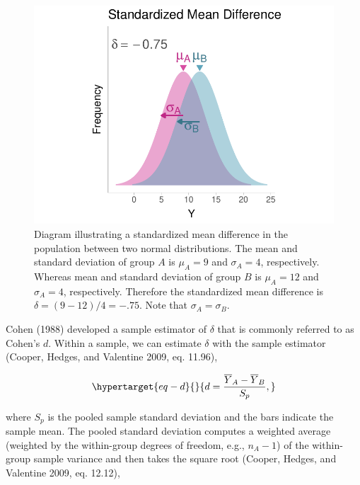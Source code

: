 \documentclass[
  letterpaper,
  DIV=11,
  numbers=noendperiod]{scrreprt}
\begin{document}
\begin{figure}[H]

{\centering \includegraphics{intro_files/figure-pdf/fig-d-1.pdf}

}

\caption{\label{fig-d}Diagram illustrating a standardized mean
difference in the population between two normal distributions. The mean
and standard deviation of group \(A\) is \(\mu_A=9\) and \(\sigma_A=4\),
respectively. Whereas mean and standard deviation of group \(B\) is
\(\mu_A=12\) and \(\sigma_A=4\), respectively. Therefore the
standardized mean difference is \(\delta = (9-12)/4=-.75\). Note that
\(\sigma_A=\sigma_B\).}

\end{figure}

Cohen (1988) developed a sample estimator of \(\delta\) that is commonly
referred to as Cohen's \(d\). Within a sample, we can estimate
\(\delta\) with the sample estimator (Cooper, Hedges, and Valentine
2009, eq. 11.96),

\begin{equation}\protect\hypertarget{eq-d}{}{
d = \frac{\overline{Y}_A-\overline{Y}_B}{S_p},
}\label{eq-d}\end{equation}

where \(S_p\) is the pooled sample standard deviation and the bars
indicate the sample mean. The pooled standard deviation computes a
weighted average (weighted by the within-group degrees of freedom, e.g.,
\(n_{A}-1\)) of the within-group sample variance and then takes the
square root (Cooper, Hedges, and Valentine 2009, eq. 12.12),
\end{document}
